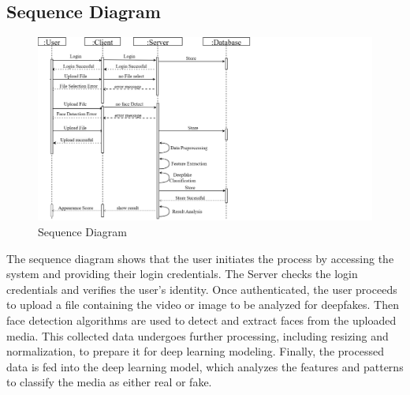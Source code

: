 \subsection{Sequence Diagram}

\begin{figure}[h]
    \centering
    \includegraphics[width=1.6\textwidth,height=\textheight,keepaspectratio]{img/sequencediagram.drawio.png}
    \caption{{Sequence Diagram}}
\end{figure}

\justify
The sequence diagram shows that the user initiates the process by accessing the system and providing their login credentials. The Server checks the login credentials and verifies the user's identity. Once authenticated, the user proceeds to upload a file containing the video or image to be analyzed for deepfakes. Then face detection algorithms are used to detect and extract faces from the uploaded media. This collected data undergoes further processing, including resizing and normalization, to prepare it for deep learning modeling. Finally, the processed data is fed into the deep learning model, which analyzes the features and patterns to classify the media as either real or fake.
